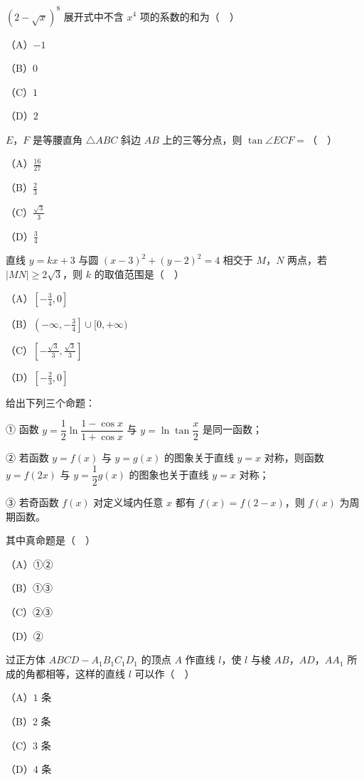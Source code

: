 \begin{question}
$(2-\sqrt x)^8$ 展开式中不含 $x^4$ 项的系数的和为（　）

（A）$-1$

（B）$0$

（C）$1$

（D）$2$

\end{question}
\begin{question}
$E$，$F$ 是等腰直角 $\triangle ABC$ 斜边 $AB$ 上的三等分点，则 $\tan\angle ECF=$（　）

（A）$\frac{16}{27}$

（B）$\frac23$

（C）$\frac{\sqrt3}3$

（D）$\frac34$

\end{question}
\begin{question}
直线 $y=kx+3$ 与圆 $(x-3)^2+(y-2)^2=4$ 相交于 $M$，$N$ 两点，若 $|MN|\geqslant2\sqrt3$，则 $k$ 的取值范围是（　）

（A）$\left[-\frac34,0\right]$

（B）$\left(-\infty,-\frac34\right]\cup[0,+\infty)$

（C）$\left[-\frac{\sqrt3}3,\frac{\sqrt3}3\right]$

（D）$\left[-\frac23,0\right]$

\end{question}
\begin{question}
给出下列三个命题：

① 函数 $y=\dfrac12\ln\dfrac{1-\cos x}{1+\cos x}$ 与 $y=\ln\tan\dfrac x2$ 是同一函数；

② 若函数 $y=f(x)$ 与 $y=g(x)$ 的图象关于直线 $y=x$ 对称，则函数 $y=f(2x)$ 与 $y=\dfrac12g(x)$ 的图象也关于直线 $y=x$ 对称；

③ 若奇函数 $f(x)$ 对定义域内任意 $x$ 都有 $f(x)=f(2-x)$，则 $f(x)$ 为周期函数。

其中真命题是（　）

（A）①②

（B）①③

（C）②③

（D）②

\Needspace{0.4\textheight}
\end{question}
\begingroup
\renewenvironment{question}{\Needspace{0.5\textheight}}{}
\begin{question}
过正方体 $ABCD-A_1B_1C_1D_1$ 的顶点 $A$ 作直线 $l$，使 $l$ 与棱 $AB$，$AD$，$AA_1$ 所成的角都相等，这样的直线 $l$ 可以作（　）

（A）$1$ 条

（B）$2$ 条

（C）$3$ 条

（D）$4$ 条
\nopagebreak[4]
\begin{center}\end{center}
\nopagebreak[4]
\end{question}
